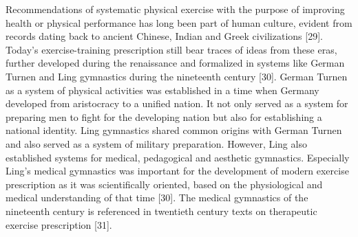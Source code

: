\documentclass[twoside,10pt]{gihclass} %
\begin{document}
Recommendations of systematic physical exercise with the purpose of improving health or physical performance has long been part of human culture, evident from records dating back to ancient Chinese, Indian and Greek civilizations
{[}29{]}.
Today's exercise-training prescription still bear traces of ideas from these eras, further developed during the renaissance and formalized in systems like German Turnen and Ling gymnastics during the nineteenth century
{[}30{]}.
German Turnen as a system of physical activities was established in a time when Germany developed from aristocracy to a unified nation.
It not only served as a system for preparing men to fight for the developing nation but also for establishing a national identity.
Ling gymnastics shared common origins with German Turnen and also served as a system of military preparation.
However, Ling also established systems for medical, pedagogical and aesthetic gymnastics.
Especially Ling's medical gymnastics was important for the development of modern exercise prescription as it was scientifically oriented, based on the physiological and medical understanding of that time {[}30{]}.
The medical gymnastics of the nineteenth century is referenced in twentieth century texts on therapeutic exercise prescription
{[}31{]}.
\end{document}
